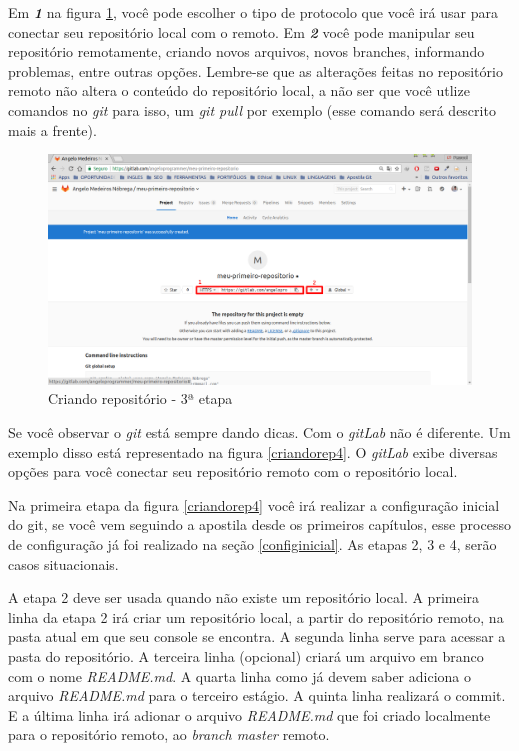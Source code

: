 \documentclass[12pt,openright,oneside,a4paper,english,brazil]{abntex2}
\begin{document}
Em \textbf{\textit{1}} na figura \ref{criandorep3}, você pode escolher o tipo de protocolo que você irá usar para conectar seu repositório local com o remoto. Em \textbf{\textit{2}}  você pode manipular seu repositório remotamente, criando novos arquivos, novos branches, informando problemas, entre outras opções. Lembre-se que as alterações feitas no repositório remoto não altera o conteúdo do repositório local, a não ser que você utlize comandos no \textit{git} para isso, um \textit{git pull} por exemplo (esse comando será descrito mais a frente).

\begin{figure}[h]
	\caption{\label{criandorep3}Criando repositório - 3ª etapa}
	\begin{center}
		\includegraphics[width=1\linewidth]{criandorep3}
	\end{center}
\end{figure}

Se você observar o \textit{git} está sempre dando dicas. Com o \textit{gitLab} não é diferente. Um exemplo disso está representado na figura \ref{criandorep4}. O \textit{gitLab} exibe diversas opções para você conectar seu repositório remoto com o repositório local. 

Na primeira etapa da figura \ref{criandorep4} você irá realizar a configuração inicial do git, se você vem seguindo a apostila desde os primeiros capítulos, esse processo de configuração já foi realizado na seção \ref{configinicial}. As etapas 2, 3 e 4, serão casos situacionais. 

A etapa 2 deve ser usada quando não existe um repositório local. A primeira linha da etapa 2 irá criar um repositório local, a partir do repositório remoto, na pasta atual em que seu console se encontra. A segunda linha serve para acessar a pasta do repositório. A terceira linha (opcional) criará um arquivo em branco com o nome \textit{README.md}. A quarta linha como já devem saber adiciona o arquivo \textit{README.md} para o terceiro estágio. A quinta linha realizará o commit. E a última linha irá adionar o arquivo \textit{README.md} que foi criado localmente para o repositório remoto, ao \textit{branch master} remoto.
\end{document}
